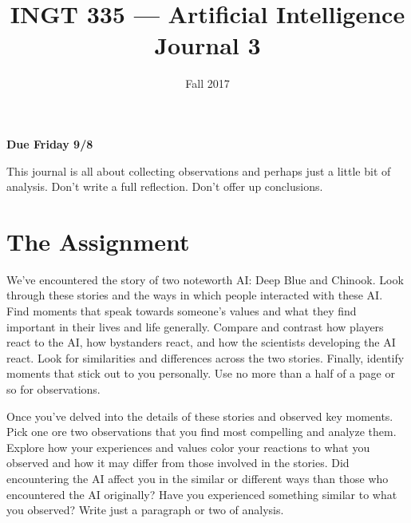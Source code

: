 \documentclass[nobib]{tufte-handout}
\title{INGT 335 --- Artificial Intelligence \\ Journal 3}
\author{}
\date{ Fall 2017 }
\begin{document}
\maketitle

\begin{center}
  \textbf{Due Friday 9/8}
\end{center}

This journal is all about collecting observations and perhaps just a little bit of analysis. Don't write a full reflection. Don't offer up conclusions.

\section{The Assignment}

We've encountered the story of two noteworth AI\@: Deep Blue and Chinook. Look through these stories and the ways in which people interacted with these AI\@. Find moments that speak towards someone's values and what they find important in their lives and life generally. Compare and contrast how players react to the AI, how bystanders react, and how the scientists developing the AI react. Look for similarities and differences across the two stories. Finally, identify moments that stick out to you personally. Use no more than a half of a page or so for observations.

Once you've delved into the details of these stories and observed key moments. Pick one ore two observations that you find most compelling and analyze them. Explore how your experiences and values color your reactions to what you observed and how it may differ from those involved in the stories. Did encountering the AI affect you in the similar or different ways than those who encountered the AI originally? Have you experienced something similar to what you observed? Write just a paragraph or two of analysis.
\end{document}
